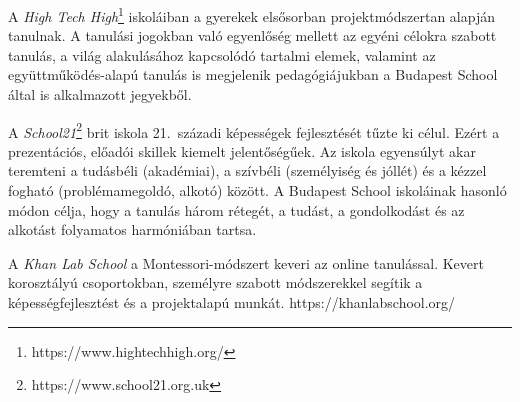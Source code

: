 A \emph{High Tech High}\footnote{https://www.hightechhigh.org/} iskoláiban a gyerekek elsősorban projektmódszertan alapján tanulnak. A tanulási jogokban való egyenlőség mellett az egyéni célokra szabott tanulás, a világ alakulásához kapcsolódó tartalmi elemek, valamint az együttműködés-alapú tanulás is megjelenik pedagógiájukban a Budapest School által is alkalmazott jegyekből.

A \emph{School21}\footnote{https://www.school21.org.uk} brit iskola 21.~századi képességek fejlesztését tűzte ki célul. Ezért a prezentációs, előadói skillek kiemelt jelentőségűek. Az iskola egyensúlyt akar teremteni a tudásbéli (akadémiai), a szívbéli (személyiség és jóllét) és a kézzel fogható (problémamegoldó, alkotó) között. A Budapest School iskoláinak hasonló módon célja, hogy a tanulás három rétegét, a tudást, a gondolkodást és az alkotást folyamatos harmóniában tartsa.

A \emph{Khan Lab School} a Montessori-módszert keveri az online tanulással. Kevert korosztályú csoportokban, személyre szabott módszerekkel segítik a képességfejlesztést és a projektalapú munkát. https://khanlabschool.org/

